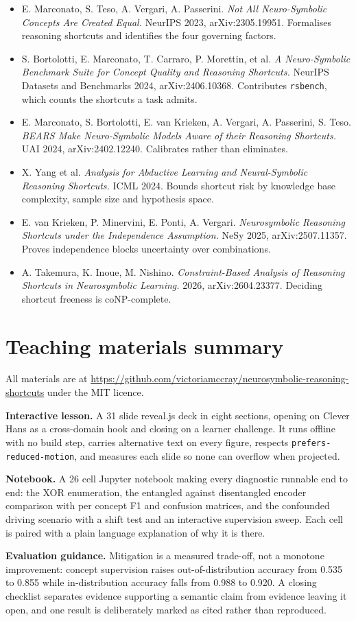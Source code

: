 \documentclass{article}
\begin{document}
\begin{itemize}
  \item E. Marconato, S. Teso, A. Vergari, A. Passerini. \emph{Not All
    Neuro-Symbolic Concepts Are Created Equal.} NeurIPS 2023, arXiv:2305.19951.
    Formalises reasoning shortcuts and identifies the four governing factors.
  \item S. Bortolotti, E. Marconato, T. Carraro, P. Morettin, et al. \emph{A
    Neuro-Symbolic Benchmark Suite for Concept Quality and Reasoning Shortcuts.}
    NeurIPS Datasets and Benchmarks 2024, arXiv:2406.10368. Contributes
    \texttt{rsbench}, which counts the shortcuts a task admits.
  \item E. Marconato, S. Bortolotti, E. van Krieken, A. Vergari, A. Passerini,
    S. Teso. \emph{BEARS Make Neuro-Symbolic Models Aware of their Reasoning
    Shortcuts.} UAI 2024, arXiv:2402.12240. Calibrates rather than eliminates.
  \item X. Yang et al. \emph{Analysis for Abductive Learning and Neural-Symbolic
    Reasoning Shortcuts.} ICML 2024. Bounds shortcut risk by knowledge base
    complexity, sample size and hypothesis space.
  \item E. van Krieken, P. Minervini, E. Ponti, A. Vergari. \emph{Neurosymbolic
    Reasoning Shortcuts under the Independence Assumption.} NeSy 2025,
    arXiv:2507.11357. Proves independence blocks uncertainty over combinations.
  \item A. Takemura, K. Inoue, M. Nishino. \emph{Constraint-Based Analysis of
    Reasoning Shortcuts in Neurosymbolic Learning.} 2026, arXiv:2604.23377.
    Deciding shortcut freeness is coNP-complete.
\end{itemize}

\section{Teaching materials summary}

All materials are at
\url{https://github.com/victoriamccray/neurosymbolic-reasoning-shortcuts}
under the MIT licence.

\textbf{Interactive lesson.} A 31 slide reveal.js deck in eight sections,
opening on Clever Hans as a cross-domain hook and closing on a learner
challenge. It runs offline with no build step, carries alternative text on every
figure, respects \texttt{prefers-reduced-motion}, and measures each slide so
none can overflow when projected.

\textbf{Notebook.} A 26 cell Jupyter notebook making every diagnostic runnable
end to end: the XOR enumeration, the entangled against disentangled encoder
comparison with per concept F1 and confusion matrices, and the confounded
driving scenario with a shift test and an interactive supervision sweep. Each
cell is paired with a plain language explanation of why it is there.

\textbf{Evaluation guidance.} Mitigation is a measured trade-off, not a monotone
improvement: concept supervision raises out-of-distribution accuracy from 0.535
to 0.855 while in-distribution accuracy falls from 0.988 to 0.920. A closing
checklist separates evidence supporting a semantic claim from evidence leaving
it open, and one result is deliberately marked as cited rather than reproduced.
\end{document}
